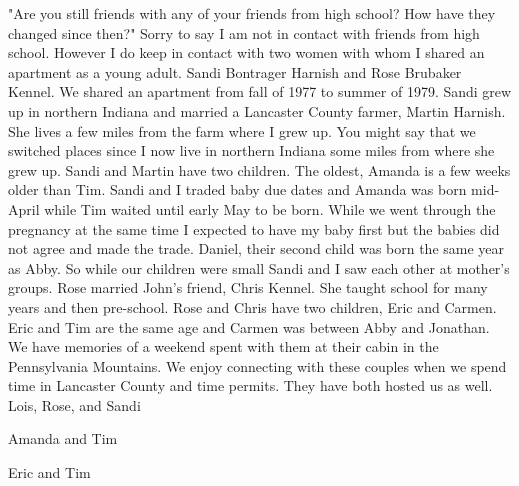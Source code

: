 "Are you still friends with any of your friends from high school? How have they changed since then?"
Sorry to say I am not in contact with friends from high school. However I do keep in contact with two women with whom I shared an apartment as a young adult. Sandi Bontrager Harnish and Rose Brubaker Kennel. We shared an apartment from fall of 1977 to summer of 1979.
Sandi grew up in northern Indiana and married a Lancaster County farmer, Martin Harnish. She lives a few miles from the farm where I grew up. You might say that we switched places since I now live in northern Indiana some miles from where she grew up. 
Sandi and Martin have two children. The oldest, Amanda is a few weeks older than Tim. Sandi and I traded baby due dates and Amanda was born mid-April while Tim waited until early May to be born. While we went through the pregnancy at the same time I expected to have my baby first but the babies did not agree and made the trade.
Daniel, their second child was born the same year as Abby. So while our children were small Sandi and I saw each other at mother's groups.
Rose married John's friend, Chris Kennel. She taught school for many years and then pre-school. Rose and Chris have two children, Eric and Carmen. Eric and Tim are the same age and Carmen was between Abby and Jonathan. We have memories of a weekend spent with them at their cabin in the Pennsylvania Mountains.
We enjoy connecting with these couples when we spend time in Lancaster County and time permits. They have both hosted us as well.
Lois, Rose, and Sandi

Amanda and Tim

Eric and Tim





